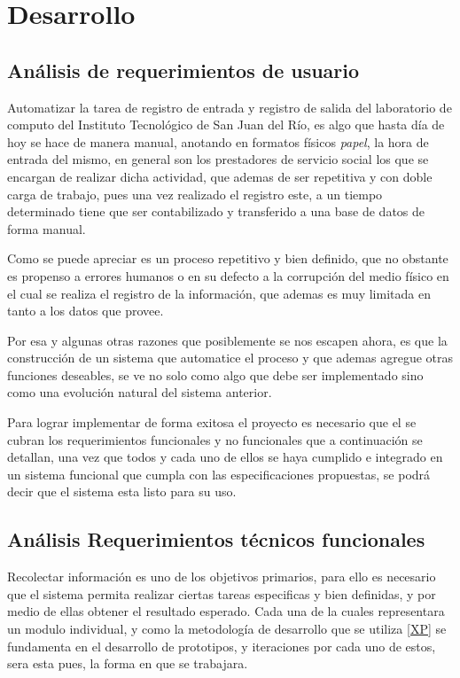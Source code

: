 \documentclass[12pt]{article} %
\begin{document}
\newpage			
\newpage
\section{Desarrollo}
  \subsection{Análisis de requerimientos de usuario}
		
			Automatizar la tarea de registro de entrada y registro de salida del laboratorio de computo del Instituto Tecnológico de San Juan del R\'io, es algo que hasta
		d\'ia de hoy se hace de manera manual, anotando en formatos físicos \textit{papel}, la hora de entrada del mismo, en general son los prestadores de servicio social 
		los que se encargan de realizar dicha actividad, que ademas de ser repetitiva y con doble carga de trabajo, pues una vez realizado el registro este, a un tiempo
		determinado tiene  que ser contabilizado y transferido a una base de datos de forma manual.
		
		Como se puede apreciar es un proceso repetitivo y bien definido, que no obstante es propenso a errores humanos o en su defecto a la corrupción del medio físico en 
		el cual se realiza el registro de la información, que ademas es muy limitada en tanto a los datos que provee.
		
		Por esa y algunas otras razones que posiblemente se nos escapen ahora, es que la construcción de un sistema que automatice el proceso y que ademas agregue otras
		funciones deseables, se ve no solo como algo que debe ser implementado sino como una evolución natural del sistema anterior.
		
		Para lograr implementar de forma exitosa el proyecto es necesario que el se cubran los requerimientos funcionales y no funcionales que a continuación se detallan,
		una vez que todos y cada uno de ellos se haya cumplido e integrado en un sistema funcional que cumpla con las especificaciones propuestas, se podrá decir que el 
		sistema esta listo para su uso.
		 	
  \subsection[Requerimientos funcionales]{An\'alisis Requerimientos t\'ecnicos funcionales \label{funcionales}}
		
			Recolectar información es uno de los objetivos primarios, para ello es necesario que el sistema permita realizar ciertas tareas especificas y bien definidas,
		y por medio de ellas obtener el resultado esperado.
		Cada una de la cuales representara un modulo individual, y como la metodología de desarrollo que se utiliza \ref{XP} se fundamenta en el desarrollo de prototipos,
		y iteraciones por cada uno de estos, sera esta pues, la forma en que se trabajara.
		
\end{document}
